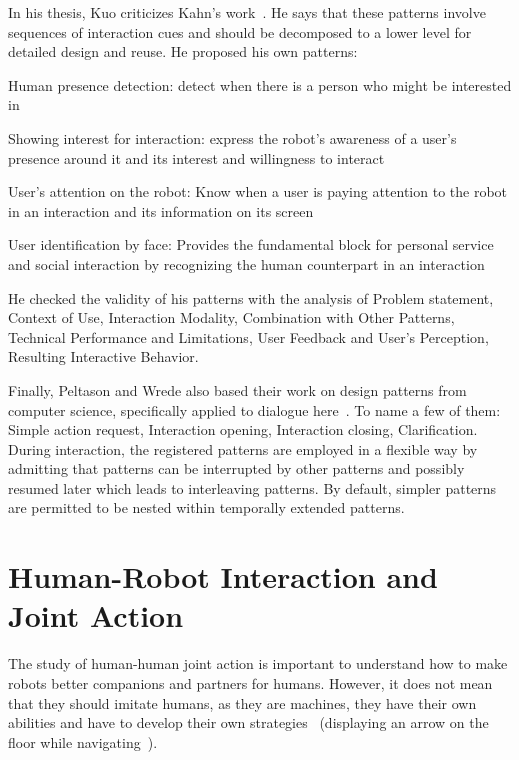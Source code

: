 \documentclass[a4paper,11pt,twoside]{StyleThese}
\begin{document}
In his thesis, Kuo criticizes Kahn’s work~\cite{kuo_2012_designing}. He says that these patterns involve sequences of interaction cues and should be decomposed to a lower level for detailed design and reuse. He proposed his own patterns:
\begin{bulletList}
	\item Human presence detection: detect when there is a person who might be interested in
	\item Showing interest for interaction: express the robot’s awareness of a user’s presence around it and its interest and willingness to interact
	\item User’s attention on the robot: Know when a user is paying attention to the robot in an interaction and its information on its screen
	\item User identification by face: Provides the fundamental block for personal service and social interaction by recognizing the human counterpart in an interaction
\end{bulletList}
He checked the validity of his patterns with the analysis of Problem statement, Context of Use, Interaction Modality, Combination with Other Patterns, Technical Performance and Limitations, User Feedback and User’s Perception, Resulting Interactive Behavior.

Finally, Peltason and Wrede also based their work on design patterns from computer science, specifically applied to dialogue here~\cite{peltason_2010_pamini}. To name a few of them: Simple action request, Interaction opening, Interaction closing, Clarification. During interaction, the registered patterns are employed in a flexible way by admitting that patterns can be interrupted by other patterns and possibly resumed later which leads to interleaving patterns. By default, simpler patterns are permitted to be nested within temporally extended patterns.




\section{Human-Robot Interaction and Joint Action}\label{chap2:sec:hri_ja}
The study of human-human joint action is important to understand how to make robots better companions and partners for humans. However, it does not mean that they should imitate humans, as they are machines, they have their own abilities and have to develop their own strategies~\cite{bradshaw_2017_human} (\eg displaying an arrow on the floor while navigating~\cite{chadalavada_2015_mind, coovert_2014_spatial}).
\end{document}
